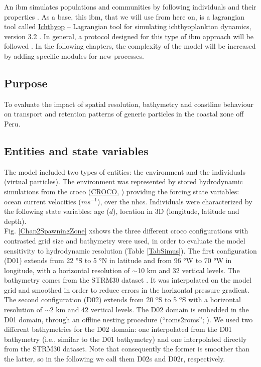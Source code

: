 An \acrfull{ibm} simulates populations and communities by following individuals and their properties \citep{DeanGrim2014}. As a base, this \acrshort{ibm}, that we will use from here on, is a lagrangian tool called \href{https://ichthyop.org/}{Ichthyop} – Lagrangian tool for simulating ichthyoplankton dynamics, version 3.2 \citep{LettVerl2008}. In general, a protocol designed for this type of \acrshort{ibm} approach will be followed \citep{GrimBerg2006,GrimBerg2010}. In the following chapters, the complexity of the model will be increased by adding specific modules for new processes.\\

\subsection{Purpose}\label{Chap2MethPurp}

To evaluate the impact of spatial resolution, bathymetry and coastline behaviour on transport and retention patterns of generic particles in the coastal zone off Peru.\\

\subsection{Entities and state variables}\label{Chap2MethEnti}

The model included two types of entities: the environment and the individuals (virtual particles). The environment was represented by stored hydrodynamic simulations from the \acrlong{croco} (\href{https://www.croco-ocean.org/}{CROCO}, \cite{HiltAucl2020,ShchMcwi2005}) providing the forcing state variables: ocean current velocities ($ms^{-1}$), over the \acrshort{nhcs}. Individuals were characterized by the following state variables: age ($d$), location in 3D (longitude, latitude and depth).\\

Fig. \ref{Chap2SpawningZone} xshows the three different \acrshort{croco} configurations with contrasted grid size and bathymetry were used, in order to evaluate the model sensitivity to hydrodynamic resolution (Table \ref{TabSimus}). The first configuration (D01) extends from 22 °S to 5 °N in latitude and from 96 °W to 70 °W in longitude, with a horizontal resolution of $\sim$10 km and 32 vertical levels. The bathymetry comes from the STRM30 dataset \citep{BeckSand2009}. It was interpolated on the model grid and smoothed in order to reduce errors in the horizontal pressure gradient. The second configuration (D02) extends from 20 ºS to 5 ºS with a horizontal resolution of $\sim$2 km and 42 vertical levels. The D02 domain is embedded in the D01 domain, through an offline nesting procedure (``roms2roms''; \cite{MasoMole2010}). We used two different bathymetries for the D02 domain: one interpolated from the D01 bathymetry (i.e., similar to the D01 bathymetry) and one interpolated directly from the STRM30 dataset. Note that consequently the former is smoother than the latter, so in the following we call them D02s and D02r, respectively.\\

